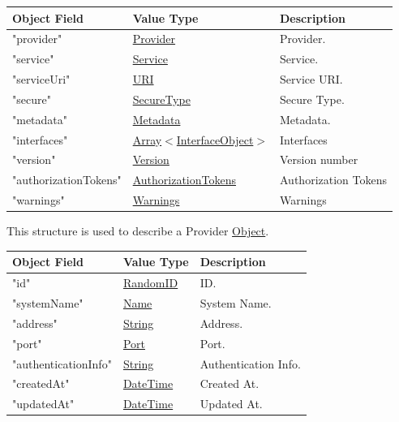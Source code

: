 \documentclass[a4paper]{arrowhead}
\newcommand{\mref}[1]{{\textcolor{ArrowheadPurple}{\hyperref[sec:model:#1]{#1}}}}
\newcommand{\pref}[1]{{\textcolor{ArrowheadGrey}{\hyperref[sec:model:primitives:#1]{#1}}}}
\begin{document}
\begin{table}[ht!]
\begin{tabularx}{\textwidth}{| p{5cm} | p{3.5cm} | X |} \hline
\rowcolor{gray!33} Object Field & Value Type               & Description \\ \hline
"provider"            & \pref{Provider}                    & Provider. \\ \hline
"service"             & \pref{Service}                     & Service. \\ \hline
"serviceUri"          & \pref{URI}                         & Service URI. \\ \hline
"secure"              & \pref{SecureType}                  & Secure Type. \\ \hline
"metadata"            & \pref{Metadata}                    & Metadata. \\ \hline 
"interfaces"          & \pref{Array}$<$\mref{InterfaceObject}$>$ & Interfaces \\ \hline
"version"             & \pref{Version}                     & Version number \\ \hline
"authorizationTokens" & \pref{AuthorizationTokens}         & Authorization Tokens \\ \hline 
"warnings"            & \pref{Warnings}                    & Warnings \\ \hline

\end{tabularx}
\end{table}


This structure is used to describe a Provider \pref{Object}. 

\begin{table}[ht!]
\begin{tabularx}{\textwidth}{| p{6cm} | p{5cm} | X |} \hline
\rowcolor{gray!33} Object Field & Value Type      & Description \\ \hline
"id"                 & \pref{RandomID} & ID. \\ \hline
"systemName"         & \pref{Name}     & System Name. \\ \hline
"address"            & \pref{String}   & Address. \\ \hline
"port"               & \pref{Port}     & Port. \\ \hline
"authenticationInfo" & \pref{String}   & Authentication Info. \\ \hline
"createdAt"          & \pref{DateTime} & Created At. \\ \hline
"updatedAt"          & \pref{DateTime} & Updated At. \\ \hline

\end{tabularx}
\end{table}
\end{document}
